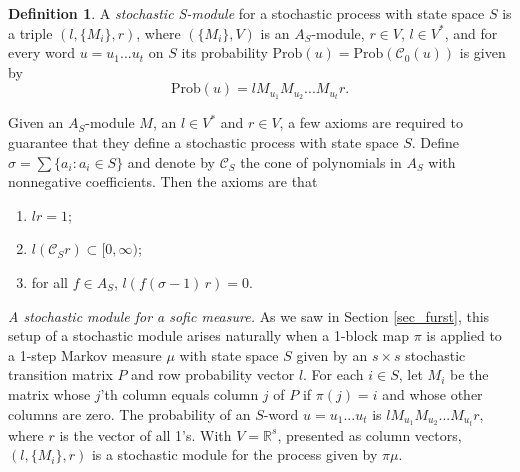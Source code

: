 \documentclass{kepart2010}
\theoremstyle{plain}
\theoremstyle{definition}
\newtheorem{defn}[thm]{Definition}
\theoremstyle{remark}
\theoremstyle{definition}
\numberwithin{equation}{section}
\begin{document}
\begin{defn}\label{def_stochmod}
A {\em stochastic S-module} for a stochastic process with
state space $S$
 is a triple $(l,\{M_i\},r)$, where
$(\{M_i\},V)$ is an $A_S$-module, $r\in
V$, $l \in V^*$, and for every word $u=u_1...u_t$ on $S$ its
probability $\text{Prob}(u)=\text{Prob}({{\mathcal C}}_0(u))$ is given by
 \begin{equation}
 \text{Prob}(u)=    l M_{u_1}M_{u_2}...M_{u_t}r.
 \end{equation}
 \end{defn}
Given an $A_S$-module $M$, an $l \in V^*$ and $r \in V$, a few
axioms are required to guarantee that they define a stochastic
process with state space $S$. Define
$\sigma=\sum\{a_i: a_i \in S\}$ and
denote by ${{\mathcal C}}_S$ the cone of polynomials in $A_S$ with nonnegative
coefficients. Then the axioms are that
\begin{enumerate}
\item $lr=1$;
\item $l({{\mathcal C}}_Sr) \subset [0, \infty)$;
\item for all $f \in A_S$, $l(f(\sigma -1)\, r)=0$.
\end{enumerate}

\begin{ex}{\it A stochastic module for a sofic measure.}  \label{stochsofic}
As we saw in Section \ref{sec_furst}, this setup of a stochastic
module arises naturally when a 1-block map $\pi$ is applied to a
1-step Markov measure $\mu$ with state space $S$ given by an
$s\times s$ stochastic transition matrix
 $P$
and row probability vector $l$. For each $i \in S$, let $M_i$ be the
matrix whose $j$'th column equals column $j$ of $P$ if $\pi (j)=i$
and whose other columns are zero. The probability of an $S$-word
$u=u_1...u_t$ is
 $lM_{u_1}M_{u_2}...M_{u_t}r$, where $r$ is the vector of all
1's. With $V={\mathbb R}^s$, presented as column vectors, $(l,
\{M_i\},r)$ is a
stochastic module for the process given by $\pi\mu$.
\end{ex}
\end{document}
